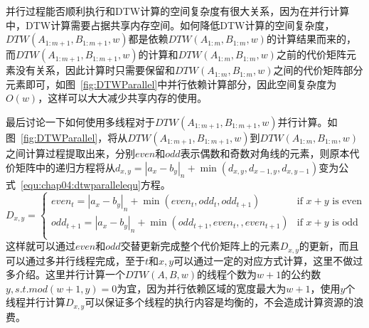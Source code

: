 并行过程能否顺利执行和DTW计算的空间复杂度有很大关系，因为在并行计算中，DTW计算需要占据共享内存空间。如何降低DTW计算的空间复杂度，$DTW(A_{1:m+1},B_{1:m+1},w)$都是依赖$DTW(A_{1:m},B_{1:m},w)$的计算结果而来的，而$DTW(A_{1:m+1},B_{1:m+1},w)$的计算和$DTW(A_{1:m},B_{1:m},w)$之前的代价矩阵元素没有关系，因此计算时只需要保留和$DTW(A_{1:m},B_{1:m},w)$之间的代价矩阵部分元素即可，如图~\ref{fig:DTWParallel}中并行依赖计算部分，因此空间复杂度为$O(w)$，这样可以大大减少共享内存的使用。

最后讨论一下如何使用多线程对于$DTW(A_{1:m+1},B_{1:m+1},w)$并行计算。如图~\ref{fig:DTWParallel}，将从$DTW(A_{1:m+1},B_{1:m+1},w)$到$DTW(A_{1:m},B_{1:m},w)$之间计算过程提取出来，分别$even$和$odd$表示偶数和奇数对角线的元素，则原本代价矩阵中的递归方程将从$d_{x,y}=|a_x-b_y|_n + \min(d_{x,y},d_{x-1,y},d_{x,y-1})$变为公式~\ref{equ:chap04:dtwparallelequ}方程。
\begin{equation}
\label{equ:chap04:dtwparallelequ}
D_{x,y} = 
\begin{cases}
even_t=|a_x-b_y|_n+\min(even_t,odd_t,odd_{t+1}) & \text{if $x+y$ is even }\\
odd_{t+1}=|a_x-b_y|_n+\min(odd_{t+1},even_t,,even_{t+1}) & \text{if $x+y$ is odd}\\
\end{cases}
\end{equation}
这样就可以通过$even$和$odd$交替更新完成整个代价矩阵上的元素$D_{x,y}$的更新，而且可以通过多并行线程完成，至于$t$和$x,y$可以通过一定的对应方式计算，这里不做过多介绍。这里并行计算一个$DTW(A,B,w)$的线程个数为$w+1$的公约数$y,s.t. mod(w+1,y)=0$为宜，因为并行依赖区域的宽度最大为$w+1$，使用$y$个线程并行计算$D_{x,y}$可以保证多个线程的执行内容是均衡的，不会造成计算资源的浪费。

%
%

